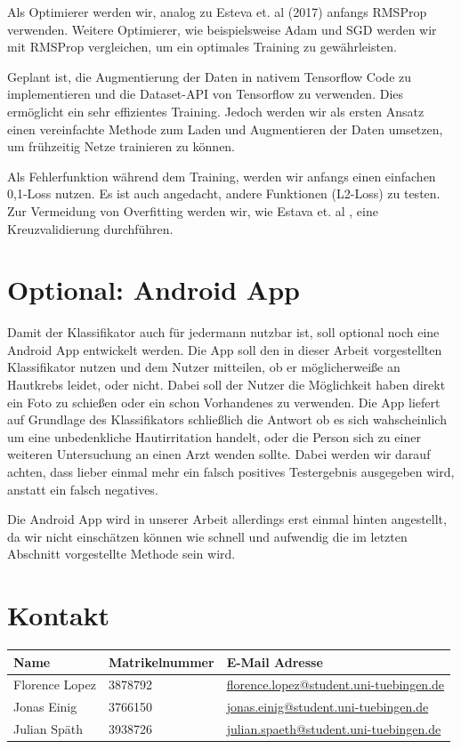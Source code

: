 \documentclass[%
   10pt,              %
   a4paper,           %
   DIV10,             %
]{scrartcl}%
\begin{document}
\noindent Als Optimierer werden wir, analog zu Esteva et. al (2017) \cite{skincancer} anfangs RMSProp verwenden. Weitere Optimierer, wie beispielsweise Adam und SGD werden wir mit RMSProp vergleichen, um ein optimales Training zu gewährleisten.

\noindent Geplant ist, die Augmentierung der Daten in nativem Tensorflow Code zu implementieren und die Dataset-API von Tensorflow zu verwenden. Dies ermöglicht ein sehr effizientes Training. Jedoch werden wir als ersten Ansatz einen vereinfachte Methode zum Laden und Augmentieren der Daten umsetzen, um frühzeitig Netze trainieren zu können.

\noindent Als Fehlerfunktion während dem Training, werden wir anfangs einen einfachen 0,1-Loss nutzen. Es ist auch angedacht, andere Funktionen (L2-Loss) zu testen. 
 Zur Vermeidung von Overfitting werden wir, wie Estava et. al \cite{skincancer}, eine Kreuzvalidierung durchführen. 

\section*{Optional: Android App}
Damit der Klassifikator auch für jedermann nutzbar ist, soll optional noch eine Android App entwickelt werden. Die App soll den in dieser Arbeit vorgestellten Klassifikator nutzen und dem Nutzer mitteilen, ob er möglicherweiße an Hautkrebs leidet, oder nicht. Dabei soll der Nutzer die Möglichkeit haben direkt ein Foto zu schießen oder ein schon Vorhandenes zu verwenden. Die App liefert auf Grundlage des Klassifikators schließlich die Antwort ob es sich wahscheinlich um eine unbedenkliche Hautirritation handelt, oder die Person sich zu einer weiteren Untersuchung an einen Arzt wenden sollte. Dabei werden wir darauf achten, dass lieber einmal mehr ein falsch positives Testergebnis ausgegeben wird, anstatt ein falsch negatives.

Die Android App wird in unserer Arbeit allerdings erst einmal hinten angestellt, da wir nicht einschätzen können wie schnell und aufwendig die im letzten Abschnitt vorgestellte Methode sein wird.

\section*{Kontakt}
\centering
\begin{tabular}{lll}
\toprule
Name & Matrikelnummer & E-Mail Adresse \\
\midrule
Florence Lopez & 3878792  &  \href{mailto:florence.lopez@student.uni-tuebingen.de}{florence.lopez@student.uni-tuebingen.de} \\
Jonas Einig  & 3766150    & \href{mailto:jonas.einig@student.uni-tuebingen.de}{jonas.einig@student.uni-tuebingen.de}    \\
Julian Späth  & 3938726    & \href{mailto:julian.spaeth@student.uni-tuebingen.de}{julian.spaeth@student.uni-tuebingen.de}    \\
\bottomrule
\end{tabular}



\end{document}
